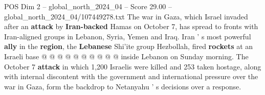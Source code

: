 \begin{textsample}{POS Dim 2 – global\_north\_2024\_04 – Score 29.00 – global\_north\_2024\_04/107449278.txt}
The war in Gaza, which Israel invaded after an \textbf{attack} by \textbf{Iran-backed} Hamas on October 7, has spread to fronts with Iran-aligned groups in Lebanon, Syria, Yemen and Iraq.
Iran ' s most powerful \textbf{ally} in the \textbf{region}, the \textbf{Lebanese} Shi'ite group Hezbollah, fired \textbf{rockets} at an Israeli base @ @ @ @ @ @ @ @ @ @ inside Lebanon on Sunday morning.
The October 7 \textbf{attack} in which 1,200 Israelis were killed and 253 taken hostage, along with internal discontent with the government and international pressure over the war in Gaza, form the backdrop to Netanyahu ' s decisions over a response.

\end{textsample}
